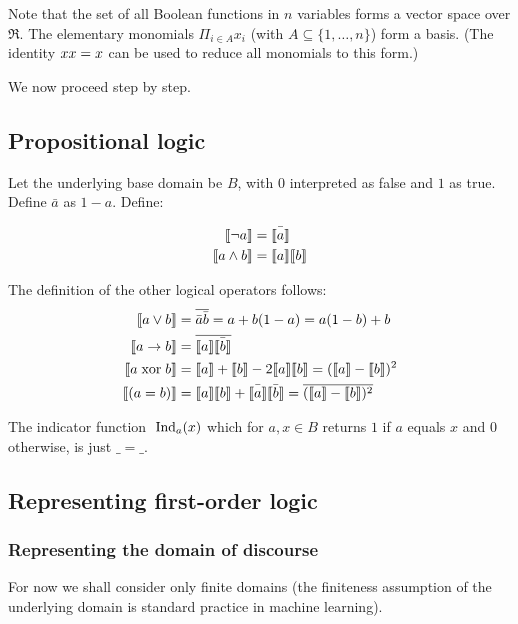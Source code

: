 \documentclass{article} %
\begin{document}
Note that the set of all Boolean functions in $n$ variables forms a vector space over $\Re$. The elementary monomials $\Pi_{i\in A} x_i$ (with $A \subseteq \{1,\ldots, n\}$) form a basis. (The identity $x x=x$ can be used to reduce all monomials to this form.) 

We now proceed step by step. 
\subsection{Propositional logic}\label{section:prop-logic}
Let the underlying base domain be $B$, with $0$ interpreted as false and $1$ as true. Define $\bar{a}$ as $1-a$. Define:

\begin{align*}
  \llbracket \neg a \rrbracket &= \bar{\llbracket a \rrbracket}\\
  \llbracket a \wedge b \rrbracket &= \llbracket a \rrbracket \llbracket b \rrbracket
\end{align*}

The definition of the other logical operators follows:
\begin{align*}
  \llbracket a\vee b \rrbracket &= \overline{\bar{a}\bar{b}} = a+b(1-a)=a(1-b)+b \\
  \llbracket a \rightarrow b \rrbracket &= \overline{\llbracket a \rrbracket\bar{\llbracket b \rrbracket}}\\
  \llbracket a \;\mbox{xor}\; b \rrbracket &= \llbracket a \rrbracket + \llbracket b \rrbracket - 2\llbracket a \rrbracket\llbracket b \rrbracket=(\llbracket a \rrbracket-\llbracket b \rrbracket)^2\\
  \llbracket (a = b) \rrbracket &=\llbracket a \rrbracket \llbracket b \rrbracket + \bar{\llbracket a \rrbracket}\bar{\llbracket b \rrbracket} =\overline{(\llbracket a \rrbracket-\llbracket b \rrbracket)^2}
\end{align*}

 
The indicator function $\;\mbox{Ind}_a(x)$ which for $a,x \in B$ returns
$1$ if $a$ equals $x$ and $0$ otherwise, is just $\_=\_$.

\subsection{Representing first-order logic}

\subsubsection{Representing the domain of discourse}
For now we shall consider only finite domains (the finiteness assumption of the underlying domain is standard practice in machine learning).
\end{document}

